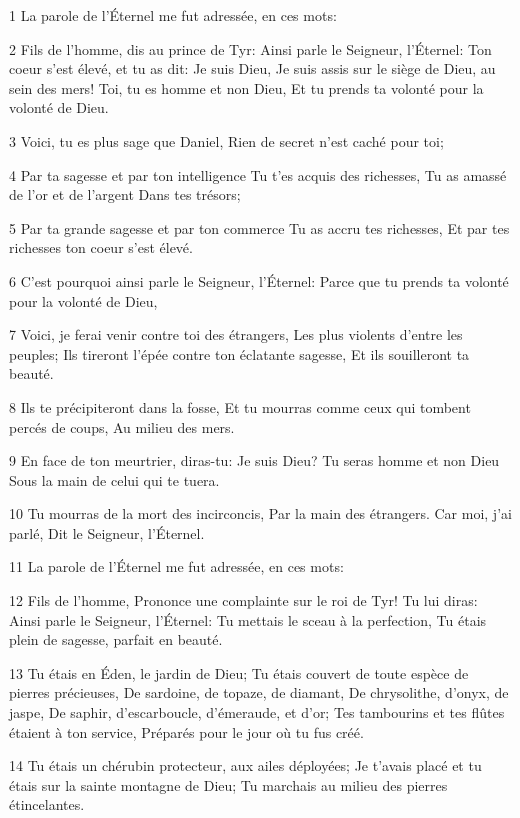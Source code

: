 \par 1 La parole de l'Éternel me fut adressée, en ces mots:
\par 2 Fils de l'homme, dis au prince de Tyr: Ainsi parle le Seigneur, l'Éternel: Ton coeur s'est élevé, et tu as dit: Je suis Dieu, Je suis assis sur le siège de Dieu, au sein des mers! Toi, tu es homme et non Dieu, Et tu prends ta volonté pour la volonté de Dieu.
\par 3 Voici, tu es plus sage que Daniel, Rien de secret n'est caché pour toi;
\par 4 Par ta sagesse et par ton intelligence Tu t'es acquis des richesses, Tu as amassé de l'or et de l'argent Dans tes trésors;
\par 5 Par ta grande sagesse et par ton commerce Tu as accru tes richesses, Et par tes richesses ton coeur s'est élevé.
\par 6 C'est pourquoi ainsi parle le Seigneur, l'Éternel: Parce que tu prends ta volonté pour la volonté de Dieu,
\par 7 Voici, je ferai venir contre toi des étrangers, Les plus violents d'entre les peuples; Ils tireront l'épée contre ton éclatante sagesse, Et ils souilleront ta beauté.
\par 8 Ils te précipiteront dans la fosse, Et tu mourras comme ceux qui tombent percés de coups, Au milieu des mers.
\par 9 En face de ton meurtrier, diras-tu: Je suis Dieu? Tu seras homme et non Dieu Sous la main de celui qui te tuera.
\par 10 Tu mourras de la mort des incirconcis, Par la main des étrangers. Car moi, j'ai parlé, Dit le Seigneur, l'Éternel.
\par 11 La parole de l'Éternel me fut adressée, en ces mots:
\par 12 Fils de l'homme, Prononce une complainte sur le roi de Tyr! Tu lui diras: Ainsi parle le Seigneur, l'Éternel: Tu mettais le sceau à la perfection, Tu étais plein de sagesse, parfait en beauté.
\par 13 Tu étais en Éden, le jardin de Dieu; Tu étais couvert de toute espèce de pierres précieuses, De sardoine, de topaze, de diamant, De chrysolithe, d'onyx, de jaspe, De saphir, d'escarboucle, d'émeraude, et d'or; Tes tambourins et tes flûtes étaient à ton service, Préparés pour le jour où tu fus créé.
\par 14 Tu étais un chérubin protecteur, aux ailes déployées; Je t'avais placé et tu étais sur la sainte montagne de Dieu; Tu marchais au milieu des pierres étincelantes.

